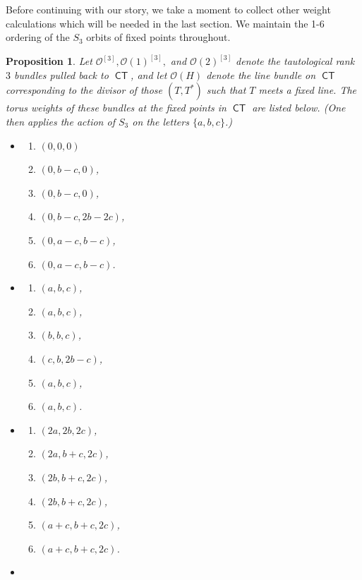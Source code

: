 \documentclass[reqno, 11pt]{amsart}
\theoremstyle{plain}
\newtheorem{proposition}[theorem]{Proposition}
\theoremstyle{remark}
\renewcommand{\O}{\mathcal{O}}
\DeclareMathOperator{\CT}{\mathsf{CT}}
\begin{document}
Before continuing with our story, we take a moment to collect other weight calculations which will be needed in the last section.  We maintain the 1-6 ordering of the $S_{3}$ orbits of fixed points throughout. 
\begin{proposition}
\label{proposition:weightstautological}
Let $\O^{[3]}, \O(1)^{[3]},$ and $\O(2)^{[3]}$ denote the tautological rank $3$ bundles pulled back to $\CT$, and let $\O(H)$ denote the line bundle on $\CT$ corresponding to the divisor of those $(T,T^{*})$ such that $T$ meets a fixed line. The torus weights of these bundles at the fixed points in $\CT$ are listed below.  (One then applies the action of $S_3$ on the letters $\{a,b,c\}$.) 
\begin{itemize}
    \item[$\O^{[3]}$:] \begin{enumerate}
        \item $(0,0,0)$
        \item $(0,b-c,0)$,
        \item $(0,b-c,0)$,
        \item $(0,b-c,2b-2c)$,
        \item $(0,a-c,b-c)$,
        \item $(0,a-c,b-c)$.
    \end{enumerate}
    \item[$\O(1)^{[3]}$:] \begin{enumerate}
        \item $(a,b,c)$,
        \item $(a,b,c)$,
        \item $(b,b,c)$,
        \item $(c,b,2b-c)$,
        \item $(a,b,c)$,
        \item $(a,b,c)$.
    \end{enumerate}
    \item[$\O(2)^{[3]}$:] \begin{enumerate}
        \item $(2a,2b,2c)$,
        \item $(2a,b+c,2c)$,
        \item $(2b,b+c,2c)$,
        \item $(2b,b+c,2c)$,
        \item $(a+c,b+c,2c)$,
        \item $(a+c,b+c,2c)$.
    \end{enumerate}
    \item[$\O(3)^{[3]}$:] \begin{enumerate}

\end{enumerate}
\end{itemize}
\end{proposition}
\end{document}
